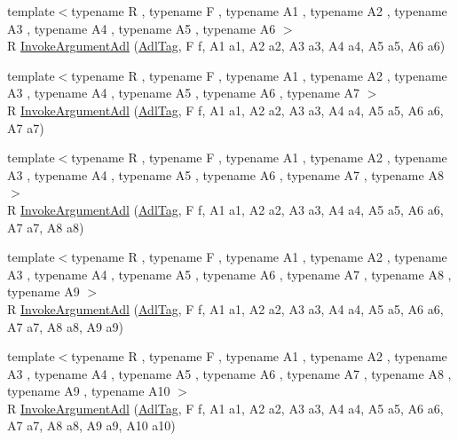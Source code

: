 \begin{DoxyCompactItemize}
\item 
{\footnotesize template$<$typename R , typename F , typename A1 , typename A2 , typename A3 , typename A4 , typename A5 , typename A6 $>$ }\\R \hyperlink{namespacetesting_1_1internal_1_1invoke__argument_a16bf1b90d183210a82fbbef4e2eef1c5}{Invoke\+Argument\+Adl} (\hyperlink{structtesting_1_1internal_1_1invoke__argument_1_1AdlTag}{Adl\+Tag}, F f, A1 a1, A2 a2, A3 a3, A4 a4, A5 a5, A6 a6)
\item 
{\footnotesize template$<$typename R , typename F , typename A1 , typename A2 , typename A3 , typename A4 , typename A5 , typename A6 , typename A7 $>$ }\\R \hyperlink{namespacetesting_1_1internal_1_1invoke__argument_a77f581ed8b270ed4752d49d5bdd59e84}{Invoke\+Argument\+Adl} (\hyperlink{structtesting_1_1internal_1_1invoke__argument_1_1AdlTag}{Adl\+Tag}, F f, A1 a1, A2 a2, A3 a3, A4 a4, A5 a5, A6 a6, A7 a7)
\item 
{\footnotesize template$<$typename R , typename F , typename A1 , typename A2 , typename A3 , typename A4 , typename A5 , typename A6 , typename A7 , typename A8 $>$ }\\R \hyperlink{namespacetesting_1_1internal_1_1invoke__argument_a43c35b90896110940a0cc41c337ca306}{Invoke\+Argument\+Adl} (\hyperlink{structtesting_1_1internal_1_1invoke__argument_1_1AdlTag}{Adl\+Tag}, F f, A1 a1, A2 a2, A3 a3, A4 a4, A5 a5, A6 a6, A7 a7, A8 a8)
\item 
{\footnotesize template$<$typename R , typename F , typename A1 , typename A2 , typename A3 , typename A4 , typename A5 , typename A6 , typename A7 , typename A8 , typename A9 $>$ }\\R \hyperlink{namespacetesting_1_1internal_1_1invoke__argument_a6e204965286414aac5113286eb5c8996}{Invoke\+Argument\+Adl} (\hyperlink{structtesting_1_1internal_1_1invoke__argument_1_1AdlTag}{Adl\+Tag}, F f, A1 a1, A2 a2, A3 a3, A4 a4, A5 a5, A6 a6, A7 a7, A8 a8, A9 a9)
\item 
{\footnotesize template$<$typename R , typename F , typename A1 , typename A2 , typename A3 , typename A4 , typename A5 , typename A6 , typename A7 , typename A8 , typename A9 , typename A10 $>$ }\\R \hyperlink{namespacetesting_1_1internal_1_1invoke__argument_abd36164191a3e386c50243074854b272}{Invoke\+Argument\+Adl} (\hyperlink{structtesting_1_1internal_1_1invoke__argument_1_1AdlTag}{Adl\+Tag}, F f, A1 a1, A2 a2, A3 a3, A4 a4, A5 a5, A6 a6, A7 a7, A8 a8, A9 a9, A10 a10)
\end{DoxyCompactItemize}


